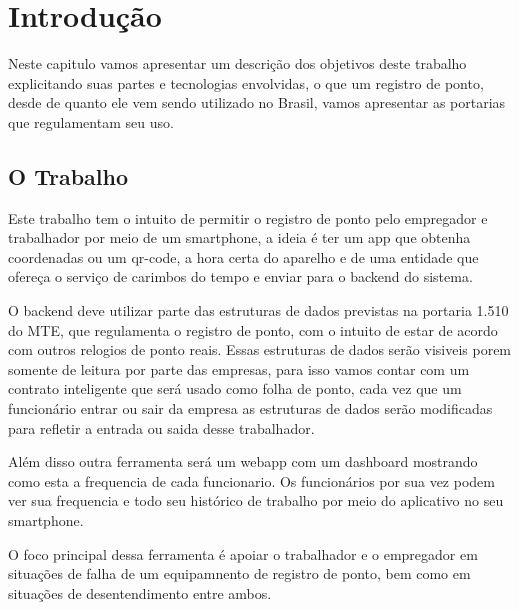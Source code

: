 \documentclass[12pt,openright,twoside,a4paper,english, brazil]{abntex2} %
\begin{document}
\listoffigures*
\cleardoublepage %
\listoftables* %
\cleardoublepage
\printterms[columns=1,style=align] %
\cleardoublepage %
\tableofcontents








\chapter{Introdução}



Neste capitulo vamos apresentar um descrição dos objetivos deste trabalho explicitando suas partes e tecnologias envolvidas, o que um registro de ponto, desde de quanto ele vem sendo utilizado no Brasil, vamos apresentar as portarias que regulamentam seu uso.

\section{O Trabalho}

Este trabalho tem o intuito de permitir o registro de ponto pelo empregador e trabalhador por meio de um smartphone, a ideia é ter um app que obtenha coordenadas ou um qr-code, a hora certa do aparelho e de uma entidade que ofereça o serviço de carimbos do tempo e enviar para o backend do sistema.

O backend deve utilizar parte das estruturas de dados previstas na portaria 1.510 do MTE, que regulamenta o registro de ponto, com o intuito de estar de acordo com outros relogios de ponto reais. Essas estruturas de dados serão visiveis porem somente de leitura por parte das empresas, para isso vamos contar com um contrato inteligente que será usado como folha de ponto, cada vez que um funcionário entrar ou sair da empresa as estruturas de dados serão modificadas para refletir a entrada ou saida desse trabalhador.

Além disso outra ferramenta será um webapp com um dashboard mostrando como esta a frequencia de cada funcionario. Os funcionários por sua vez podem ver sua frequencia e todo seu histórico de trabalho por meio do aplicativo no seu smartphone.

O foco principal dessa ferramenta é apoiar o trabalhador e o empregador em situações de falha de um equipamnento de registro de ponto, bem como em situações de desentendimento entre ambos.
\end{document}
